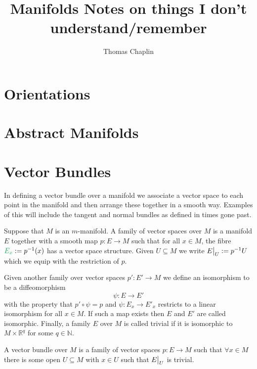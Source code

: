 \documentclass[11pt]{article}
\title{Manifolds Notes on things I don't understand/remember}
\author{Thomas Chaplin}
\date{}
\newcommand{\defeq}{:=}
\newcommand\restr[2]{{%
  \left.\kern-\nulldelimiterspace %
  #1 %
  \vphantom{\big|} %
  \right|_{#2} %
  }}
\newcommand{\R}{\mathbb{R}}
\newcommand{\N}{\mathbb{N}}
\newenvironment{defin}
	{\begin{mdframed}[backgroundcolor=white, roundcorner=5pt, linewidth=1pt, linecolor=Green]
		\setlength{\parindent}{0pt}}
	{\end{mdframed}}
\newcommand{\mdf}[1]{{\color{Green} #1}}
\begin{document}
\maketitle

\section{Orientations}
\section{Abstract Manifolds}
\section{Vector Bundles}
In defining a vector bundle over a manifold we associate a vector space to each point in the manifold and then arrange these together in a smooth way.
Examples of this will include the tangent and normal bundles as defined in times gone past.

Suppose that $M$ is an $m$-manifold.
A \mdf{family of vector spaces} over $M$ is a manifold $E$ together with a smooth map $p:E\to M$ such that for all $x\in M$, the \mdf{fibre} $\mdf{E_x}\defeq p^{-1}(x)$ has a vector space structure.
Given $U\subseteq M$ we write $\restr{E}{U}\defeq p^{-1}U$ which we equip with the restriction of $p$.

Given another family over vector spaces $p':E'\to M$ we define an \mdf{isomorphism} to be a diffeomorphism 
\[
\psi:E\to E'
\]
with the property that $p'\circ\psi = p$ and $\psi:E_x\to E'_x$ restricts to  a linear isomorphism for all $x\in M$.
If such a map exists then $E$ and $E'$ are called \mdf{isomorphic}.
Finally, a family $E$ over $M$ is called \mdf{trivial} if it is isomorphic to $M\times \R^q$ for some $q\in\N$.

\begin{figure}[H]
	\centering
\end{figure}

\begin{defin}
	A \mdf{vector bundle} over $M$ is a family of vector spaces $p:E\to M$ such that $\forall x\in M$ there is some open $U\subseteq M$ with $x\in U$ such that $\restr{E}{U}$ is trivial.
\end{defin}
\end{document}
